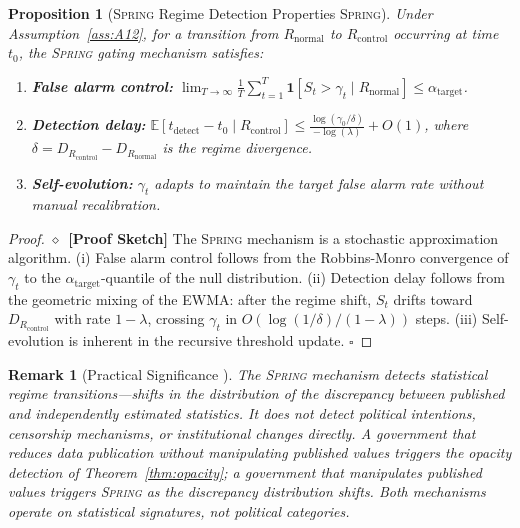 \documentclass[11pt,a4paper]{article}
\newtheorem{proposition}[theorem]{Proposition}
\newtheorem{remark}[theorem]{Remark}
\theoremstyle{definition}
\newcommand{\rigorSketch}[0]{$\diamond$~\textbf{[Proof Sketch]}}
\newcommand{\Spring}{\textsc{Spring}}
\newcommand{\E}{\mathbb{E}}
\newcommand{\ind}[1]{\mathbf{1}[#1]}
\begin{document}
\begin{proposition}[\Spring{} Regime Detection Properties \Spring{}]
\label{prop:spring_detection}
Under Assumption~\ref{ass:A12}, for a transition from $R_{\mathrm{normal}}$ to $R_{\mathrm{control}}$ occurring at time $t_0$, the \Spring{} gating mechanism satisfies:
\begin{enumerate}[label=(\roman*)]
    \item \textbf{False alarm control:} $\lim_{T \to \infty} \frac{1}{T}\sum_{t=1}^{T} \ind{S_t > \gamma_t \mid R_{\mathrm{normal}}} \leq \alpha_{\mathrm{target}}$.
    \item \textbf{Detection delay:} $\E[t_{\mathrm{detect}} - t_0 \mid R_{\mathrm{control}}] \leq \frac{\log(\gamma_0 / \delta)}{-\log(\lambda)} + O(1)$, where $\delta = D_{R_{\mathrm{control}}} - D_{R_{\mathrm{normal}}}$ is the regime divergence.
    \item \textbf{Self-evolution:} $\gamma_t$ adapts to maintain the target false alarm rate without manual recalibration.
\end{enumerate}
\end{proposition}
\begin{proof}\rigorSketch
The \Spring{} mechanism is a stochastic approximation algorithm. (i) False alarm control follows from the Robbins-Monro convergence of $\gamma_t$ to the $\alpha_{\mathrm{target}}$-quantile of the null distribution. (ii) Detection delay follows from the geometric mixing of the EWMA: after the regime shift, $S_t$ drifts toward $D_{R_{\mathrm{control}}}$ with rate $1 - \lambda$, crossing $\gamma_t$ in $O(\log(1/\delta) / (1-\lambda))$ steps. (iii) Self-evolution is inherent in the recursive threshold update. $\square$
\end{proof}
\begin{remark}[Practical Significance ]
\label{rem:spring_practical}
The \Spring{} mechanism detects \textit{statistical} regime transitions---shifts in the distribution of the discrepancy between published and independently estimated statistics. It does not detect political intentions, censorship mechanisms, or institutional changes directly. A government that reduces data publication without manipulating published values triggers the opacity detection of Theorem~\ref{thm:opacity}; a government that \textit{manipulates} published values triggers \Spring{} as the discrepancy distribution shifts. Both mechanisms operate on statistical signatures, not political categories.
\end{remark}
\end{document}
